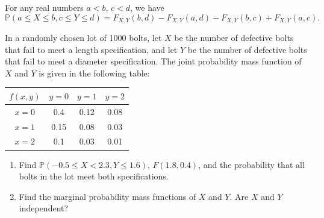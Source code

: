 \begin{theorem}
    For any real numbers $a < b$, $c < d$, we have
    \begin{equation}
        \mathbb{P}(a \leq X \leq b, c \leq Y \leq d) = F_{X,Y}(b,d) - F_{X,Y}(a,d) - F_{X,Y}(b,c) + F_{X,Y}(a,c).
    \end{equation}
\end{theorem}

\begin{example}
    \label{ex:jointpmf01}
    In a randomly chosen lot of 1000 bolts, let $X$ be the number of defective bolts that 
    fail to meet a length specification, and let $Y$ be the number of defective bolts that fail to meet a 
    diameter specification. The joint probability mass function of $X$ and $Y$ is given in the following
    table:

    \begin{center}
        \begin{tabular}{c|ccc}
            $f(x,y)$ & $y=0$ & $y=1$ & $y=2$ \\
            \hline
            $x=0$ & 0.4 & 0.12 & 0.08 \\
            $x=1$ & 0.15 & 0.08 & 0.03 \\
            $x=2$ & 0.1 & 0.03 & 0.01 \\
        \end{tabular}
    \end{center}
    \begin{enumerate}
        \item Find $\mathbb{P}(-0.5 \leq X < 2.3, Y \leq 1.6)$, $F(1.8, 0.4)$, and the 
        probability that all bolts in the lot meet both specifications.
        \item Find the marginal probability mass functions of $X$ and $Y$. Are $X$ and 
        $Y$ independent?
    \end{enumerate}
\end{example}
